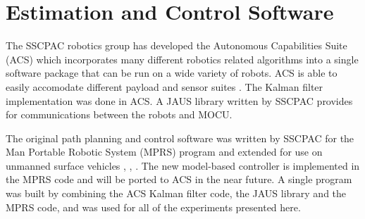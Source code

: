 \section{Estimation and Control Software}
\label{sec:bgSoftware}
The SSCPAC robotics group has developed the Autonomous Capabilities Suite (ACS) which incorporates many different robotics related algorithms into a single software package that can be run on a wide variety of robots. ACS is able to easily accomodate different payload and sensor suites \cite{Sights06}. The Kalman filter implementation was done in ACS. A JAUS library written by SSCPAC provides for communications between the robots and MOCU.

The original path planning and control software was written by SSCPAC for the Man Portable Robotic System (MPRS) program \cite{Bruch02} and extended for use on unmanned surface vehicles \cite{Ebken05}, \cite{Larson06}, \cite{Larson07}. The new model-based controller is implemented in the MPRS code and will be ported to ACS in the near future. A single program was built by combining the ACS Kalman filter code, the JAUS library and the MPRS code, and was used for all of the experiments presented here.
